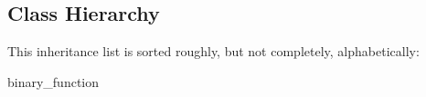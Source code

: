 \subsection{Class Hierarchy}
This inheritance list is sorted roughly, but not completely, alphabetically\+:\begin{DoxyCompactList}
\item binary\+\_\+function\begin{DoxyCompactList}
\item {}
\begin{DoxyCompactList}
\item {}
\item {}
\item {}
\end{DoxyCompactList}
\end{DoxyCompactList}
\item {}
\item {}
\end{DoxyCompactList}
